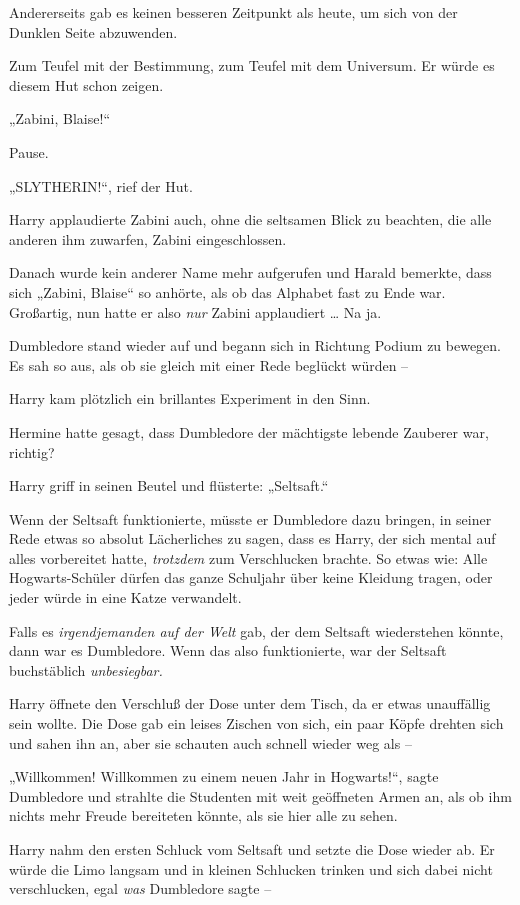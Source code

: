 {Andererseits gab es keinen besseren Zeitpunkt als heute, um sich von der Dunklen Seite abzuwenden.

Zum Teufel mit der Bestimmung, zum Teufel mit dem Universum. Er würde es diesem Hut schon zeigen.

„Zabini, Blaise!“

Pause.

„SLYTHERIN!“, rief der Hut.

Harry applaudierte Zabini auch, ohne die seltsamen Blick zu beachten, die alle anderen ihm zuwarfen, Zabini eingeschlossen.

Danach wurde kein anderer Name mehr aufgerufen und Harald bemerkte, dass sich „Zabini, Blaise“ so anhörte, als ob das Alphabet fast zu Ende war. Großartig, nun hatte er also \emph{nur} Zabini applaudiert … Na ja.

Dumbledore stand wieder auf und begann sich in Richtung Podium zu bewegen. Es sah so aus, als ob sie gleich mit einer Rede beglückt würden --

Harry kam plötzlich ein brillantes Experiment in den Sinn.

Hermine hatte gesagt, dass Dumbledore der mächtigste lebende Zauberer war, richtig?

Harry griff in seinen Beutel und flüsterte: „Seltsaft.“

Wenn der Seltsaft funktionierte, müsste er Dumbledore dazu bringen, in seiner Rede etwas so absolut Lächerliches zu sagen, dass es Harry, der sich mental auf alles vorbereitet hatte, \emph{trotzdem} zum Verschlucken brachte. So etwas wie: Alle Hogwarts-Schüler dürfen das ganze Schuljahr über keine Kleidung tragen, oder jeder würde in eine Katze verwandelt.

Falls es \emph{irgendjemanden auf der Welt} gab, der dem Seltsaft wiederstehen könnte, dann war es Dumbledore. Wenn das also funktionierte, war der Seltsaft buchstäblich \emph{unbesiegbar.}

Harry öffnete den Verschluß der Dose unter dem Tisch, da er etwas unauffällig sein wollte. Die Dose gab ein leises Zischen von sich, ein paar Köpfe drehten sich und sahen ihn an, aber sie schauten auch schnell wieder weg als --

„Willkommen! Willkommen zu einem neuen Jahr in Hogwarts!“, sagte Dumbledore und strahlte die Studenten mit weit geöffneten Armen an, als ob ihm nichts mehr Freude bereiteten könnte, als sie hier alle zu sehen.

Harry nahm den ersten Schluck vom Seltsaft und setzte die Dose wieder ab. Er würde die Limo langsam und in kleinen Schlucken trinken und sich dabei nicht verschlucken, egal \emph{was} Dumbledore sagte --

}
